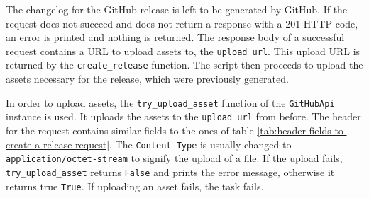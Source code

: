 The changelog for the GitHub release is left to be generated by GitHub.
If the request does not succeed and does not return a response with a 201 HTTP code, an error is printed and nothing is returned.
The response body of a successful request contains a URL to upload assets to, the \verb|upload_url|.
This upload URL is returned by the \verb|create_release| function.
The script then proceeds to upload the assets necessary for the release, which were previously generated.

In order to upload assets, the \verb|try_upload_asset| function of the \verb|GitHubApi| instance is used.
It uploads the assets to the \verb|upload_url| from before.
The header for the request contains similar fields to the ones of table \ref{tab:header-fields-to-create-a-release-request}.
The \verb|Content-Type| is usually changed to \verb|application/octet-stream| to signify the upload of a file.
If the upload fails, \verb|try_upload_asset| returns \verb|False| and prints the error message, otherwise it returns true \verb|True|.
If uploading an asset fails, the task fails.
